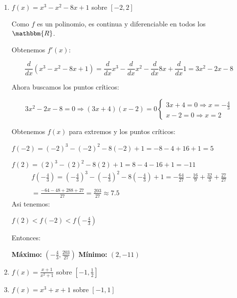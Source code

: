 \documentclass[12pt]{article}
\begin{document}
\begin{enumerate}[\hspace{9px} a)]
    \item \(f(x)=x^3-x^2-8x+1\) sobre $[-2,2]$\bigskip
    
        Como $f$ es un polinomio, es continua y diferenciable en todos los $\mathbbm{R}$.\medskip

        Obtenemos $f'(x)$:

        \[\displaystyle\frac{d}{dx}(x^3-x^2-8x+1) = \frac{d}{dx}x^3 - \frac{d}{dx}x^2 - \frac{d}{dx}8x + \frac{d}{dx}1 = 3x^2-2x-8\]\medskip

        Ahora buscamos los puntos cr\'iticos:

        \[3x^2-2x-8=0 \Rightarrow (3x+4)(x-2)=0
            \begin{cases}
                3x+4=0 \Rightarrow x=-\displaystyle\frac{4}{3}\\
                x-2=0 \Rightarrow x=2
            \end{cases}
        \]\medskip

        Obtenemos $f(x)$ para extremos y los puntos cr\'iticos:

        \(f(-2) = (-2)^3-(-2)^2-8(-2)+1 = -8-4+16+1 = 5\)

        \(f(2) = (2)^3-(2)^2-8(2)+1 = 8-4-16+1 = -11\)
        \begin{multline*}
            f\left(-\displaystyle\frac{4}{3}\right) = \left(-\frac{4}{3}\right)^3-\left(-\frac{4}{3}\right)^2-8\left(-\frac{4}{3}\right)+1 = -\frac{64}{27} -\frac{16}{9} + \frac{32}{3} +\frac{27}{27}\\ \\
            = \frac{-64-48+288+27}{27} = \frac{203}{27} \approx 7.5
        \end{multline*}
        Asi tenemos:

        \(f(2)<f(-2)<f(-\displaystyle\frac{4}{3})\)\bigskip

        Entonces:
        \begin{center}
            \textbf{M\'aximo: } $\left(-\displaystyle\frac{4}{3},\frac{203}{27}\right)$ \hspace{4em} \textbf{M\'inimo: } $(2,-11)$
        \end{center}
        

    \item \(f(x)=\displaystyle\frac{x+1}{x^2+1}\) sobre $\left[-1,\frac{1}{2}\right]$
    \item \(f(x)=x^3+x+1\) sobre $[-1,1]$\bigskip
    

\end{enumerate}
\end{document}

